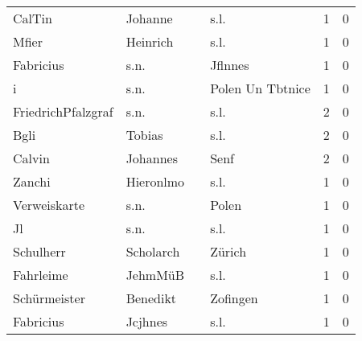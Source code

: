 \begin{center}
\begin{tiny}
\begin{longtabu}{llllrr}
                   CalTin &                            Johanne &             &                                        s.l. &          1 &         0 \\
                    Mfier &                           Heinrich &             &                                        s.l. &          1 &         0 \\
                Fabricius &                               s.n. &             &                                     Jflnnes &          1 &         0 \\
                        i &                               s.n. &             &                            Polen Un Tbtnice &          1 &         0 \\
       FriedrichPfalzgraf &                               s.n. &             &                                        s.l. &          2 &         0 \\
                     Bgli &                             Tobias &             &                                        s.l. &          2 &         0 \\
                   Calvin &                           Johannes &             &                                        Senf &          2 &         0 \\
                   Zanchi &                          Hieronlmo &             &                                        s.l. &          1 &         0 \\
             Verweiskarte &                               s.n. &             &                                       Polen &          1 &         0 \\
                       Jl &                               s.n. &             &                                        s.l. &          1 &         0 \\
                Schulherr &                          Scholarch &             &                                      Zürich &          1 &         0 \\
                Fahrleime &                            JehmMüB &             &                                        s.l. &          1 &         0 \\
             Schürmeister &                           Benedikt &             &                                    Zofingen &          1 &         0 \\
                Fabricius &                            Jcjhnes &             &                                        s.l. &          1 &         0 \\

\end{longtabu}
\end{tiny}
\end{center}
